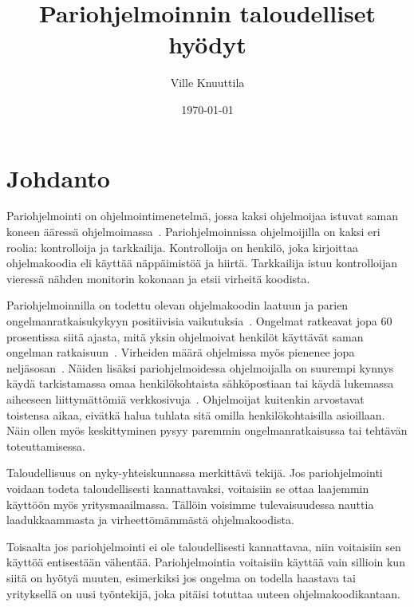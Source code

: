 \documentclass[finnish]{tktltiki2}
\title{Pariohjelmoinnin taloudelliset hyödyt}
\author{Ville Knuuttila}
\date{\today}
\theoremstyle{definition}
\theoremstyle{remark}
\begin{document}

\maketitle        %
\makeabstract     %

\tableofcontents  %
\newpage          %



\section{Johdanto}

Pariohjelmointi on ohjelmointimenetelmä, jossa kaksi ohjelmoijaa istuvat saman koneen ääressä ohjelmoimassa~\cite{pairprogramming2}. Pariohjelmoinnissa ohjelmoijilla on kaksi eri roolia: kontrolloija ja tarkkailija. Kontrolloija on henkilö, joka kirjoittaa ohjelmakoodia eli käyttää näppäimistöä ja hiirtä. Tarkkailija istuu kontrolloijan vieressä nähden monitorin kokonaan ja etsii virheitä koodista. 

Pariohjelmoinnilla on todettu olevan ohjelmakoodin laatuun ja parien ongelmanratkaisukykyyn positiivisia vaikutuksia~\cite{pairprogramming}. Ongelmat ratkeavat jopa 60 prosentissa siitä ajasta, mitä yksin ohjelmoivat henkilöt käyttävät saman ongelman ratkaisuun~\cite{meta}. Virheiden määrä ohjelmissa myös pienenee jopa neljäsosan~\cite{williams00str}. Näiden lisäksi pariohjelmoidessa ohjelmoijalla on suurempi kynnys käydä tarkistamassa omaa henkilökohtaista sähköpostiaan tai käydä lukemassa aiheeseen liittymättömiä verkkosivuja~\cite{williams03pair}. Ohjelmoijat kuitenkin arvostavat toistensa aikaa, eivätkä halua tuhlata sitä omilla henkilökohtaisilla asioillaan. Näin ollen myös keskittyminen pysyy paremmin ongelmanratkaisussa tai tehtävän toteuttamisessa.

Taloudellisuus on nyky-yhteiskunnassa merkittävä tekijä. Jos pariohjelmointi voidaan todeta taloudellisesti kannattavaksi, voitaisiin se ottaa laajemmin käyttöön myös yritysmaailmassa. Tällöin voisimme tulevaisuudessa nauttia laadukkaammasta ja virheettömämmästä ohjelmakoodista.

Toisaalta jos pariohjelmointi ei ole taloudellisesti kannattavaa, niin voitaisiin sen käyttöä entisestään vähentää. Pariohjelmointia voitaisiin käyttää vain sillioin kun siitä on hyötyä muuten, esimerkiksi jos ongelma on todella haastava tai yrityksellä on uusi työntekijä, joka pitäisi totuttaa uuteen ohjelmakoodikantaan.
\end{document}
